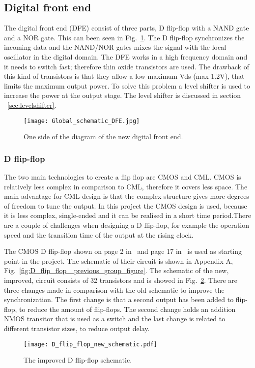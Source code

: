 \makeatletter
\newcommand*{\textoverline}[1]{$\overline{\hbox{#1}}\m@th$}
\makeatother

\subsection{Digital front end}\label{sec:frontend}
The digital front end (DFE) consist of three parts, D flip-flop with a NAND gate and a NOR gate. This can been seen in Fig.~\ref{fig:Global_schematic_DFE_figure}. The D flip-flop synchronizes the incoming data and the NAND/NOR gates mixes the signal with the local oscillator in the digital domain. The DFE works in a high frequency domain and it needs to switch fast; therefore thin oxide transistors are used. The drawback of this kind of transistors is that they allow a low maximum Vds (max 1.2V), that limits the maximum output power. To solve this problem a level shifter is used to increase the power at the output stage. The level shifter is discussed in section ~\ref{sec:levelshifter}. 

\begin{figure}[h]
\texttt{[image: Global\_schematic\_DFE.jpg]}
\caption{One side of the diagram of the new digital front end.}
\label{fig:Global_schematic_DFE_figure}
\end{figure}

\subsubsection{D flip-flop}\label{sec:frontend}
The two main technologies to create a flip flop are CMOS and CML. CMOS is relatively less complex in comparison to CML, therefore it covers less space. The main advantage for CML design is that the complex structure gives more degrees of freedom to tune the output. In this project the CMOS design is used, because it is less complex, single-ended and it can be realised in a short time period.There are a couple of challenges when designing a D flip-flop, for example the operation speed and the transition time of the output at the rising clock.

The CMOS D flip-flop shown on page 2 in~\cite{powerdac} and page 17 in~\cite{coursebook} is used as starting point in the project. The schematic of their circuit is shown in Appendix A, Fig.~\ref{fig:D_flip_flop_ previous_group_figure}. The schematic of the new, improved, circuit consists of 32 transistors and is showed in Fig.~\ref{fig:D_flip_flop_schematic_figure}. There are three changes made in comparison with the old schematic to improve the synchronization. The first change is that a second output has been added to flip-flop, to reduce the amount of flip-flops. The second change holds an addition NMOS transitor that is used as a switch and the last change is related to different transistor sizes, to reduce output delay.
\begin{figure}[h]
\texttt{[image: D\_flip\_flop\_new\_schematic.pdf]}
\caption{The improved D flip-flop schematic.}
\label{fig:D_flip_flop_schematic_figure}
\end{figure}

